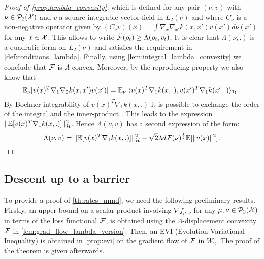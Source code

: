 \begin{proof}[Proof of \cref{prop:lambda_convexity}]
which is defined for any pair $(\nu,v)$ with  $\nu\in \mathcal{P}_2({{\mathcal X}})$ and $v$ a square integrable vector field in $L_2(\nu)$ and where $C_{\nu}$ is a non-negative operator given by  $(C_{\nu}v)(x)=\int\nabla_{x}\nabla_{x'}k(x,x')v(x')d\nu(x')$ for any $x \in {{\mathcal X}}$.
This allows to write $\ddot{{{\mathcal F}}}(\rho_t) \geq \Lambda(\rho_t,v_t)$.
It is clear that $\Lambda(\nu,.)$  is a quadratic form on $L_2(\nu)$ and satisfies the requirement in \cref{def:conditions_lambda}.
Finally, using \cref{lem:integral_lambda_convexity} we conclude that ${{\mathcal F}}$ is $\Lambda$-convex. Moreover, by the reproducing property we also know that 
\[ \mathbb{E}_{\nu}[ v(x)^T \nabla_1 \nabla_2 k(x,x') v(x') ]   = \mathbb{E}_{\nu}[\langle  v(x)^T \nabla_1 k(x,.),  v(x')^T \nabla_1k(x',.) \rangle_{{{\mathcal H}}}].
\] 
By Bochner integrability of $v(x)^T \nabla_1 k(x,.)$ it is possible to exchange the order of the integral and the inner-product \cite[Theorem 6]{Retherford:1978}. This leads to the expression $\Vert \mathbb{E}[v(x)^T \nabla_1 k(x,.)]\Vert^2_{{{\mathcal H}}}$. Hence $\Lambda(\nu,v)$ has a second expression of the form:
\[
\Lambda(\nu,v) = \Vert \mathbb{E}[v(x)^T \nabla_1 k(x,.)]\Vert^2_{{{\mathcal H}}} - \sqrt{2}\lambda d {{\mathcal F}}(\nu)^{\frac{1}{2}}\mathbb{E}[\Vert v(x)\Vert^2 ].
\]
\end{proof}


\subsection{Descent up to a barrier}

To provide a proof of \cref{th:rates_mmd}, we need the following preliminary results. Firstly, an upper-bound on a scalar product involving $\nabla f_{\mu, \nu}$ for any $\mu, \nu \in \mathcal{P}_2({{\mathcal X}})$ in terms of the loss functional ${{\mathcal F}}$, is obtained using the $\Lambda$-displacement convexity ${{\mathcal F}}$ in \cref{lem:grad_flow_lambda_version}. Then, an EVI (Evolution Variational Inequality) is obtained in \cref{prop:evi} on the gradient flow of ${{\mathcal F}}$ in $W_2$. The proof of the theorem is given afterwards.


